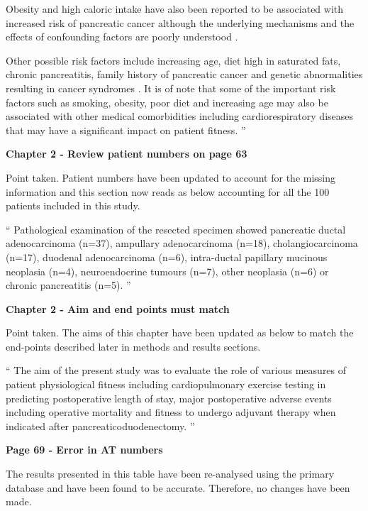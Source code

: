 	Obesity and high caloric intake have also been reported to be associated with increased risk of pancreatic cancer although the underlying mechanisms and the effects of confounding factors are poorly understood \parencite{berrington_de_gonzalez_meta-analysis_2003, larsson_body_2007, li_body_2009}. 
	
	Other possible risk factors include increasing age, diet high in saturated fats, chronic pancreatitis, family history of pancreatic cancer and genetic abnormalities resulting in cancer syndromes \parencite{raimondi_epidemiology_2009, maisonneuve_epidemiology_2010}.
	It is of note that some of the important risk factors such as smoking, obesity, poor diet and increasing age may also be associated with other medical comorbidities including cardiorespiratory diseases that may have a significant impact on patient fitness.
	\textquotedblright
	
\textbf{Chapter 2 - Review patient numbers on page 63}
	
	Point taken. Patient numbers have been updated to account for the missing information and this section now reads as below accounting for all the 100 patients included in this study.
	
	\textquotedblleft
	Pathological examination of the resected specimen showed pancreatic ductal adenocarcinoma (n=37), ampullary adenocarcinoma (n=18), cholangiocarcinoma (n=17), duodenal adenocarcinoma (n=6), intra-ductal papillary mucinous neoplasia (n=4), neuroendocrine tumours (n=7), other neoplasia (n=6) or chronic pancreatitis (n=5).
	\textquotedblright
	
\textbf{Chapter 2 - Aim and end points must match }
	
	Point taken. The aims of this chapter have been updated as below to match the end-points described later in methods and results sections. 
	
	\textquotedblleft
	The aim of the present study was to evaluate the role of various measures of patient physiological fitness including cardiopulmonary exercise testing in predicting postoperative length of stay, major postoperative adverse events including operative mortality and fitness to undergo adjuvant therapy when indicated after pancreaticoduodenectomy.
	\textquotedblright
	
\textbf{Page 69 - Error in AT numbers}
	
	The results presented in this table have been re-analysed using the primary database and have been found to be accurate. Therefore, no changes have been made.
	

